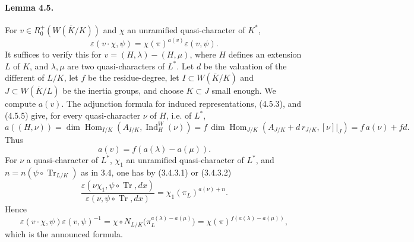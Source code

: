 \documentclass[10pt]{article}
\newcommand{\Hom}{\operatorname{Hom}}
\newcommand{\Ind}{\operatorname{Ind}}
\newcommand{\Tr}{\operatorname{Tr}}
\providecommand{\Hom}{\operatorname{Hom}}
\providecommand{\Hom}{\operatorname{Hom}}
\providecommand{\Tr}{\operatorname{Tr}}
\providecommand{\Hom}{\operatorname{Hom}}
\providecommand{\Tr}{\operatorname{Tr}}
\providecommand{\Tr}{\operatorname{Tr}}
\providecommand{\Ind}{\operatorname{Ind}}
\begin{document}
\paragraph{Lemma 4.5.} For \(v\in R^+_0(W(\overline K/K))\) and \(\chi\) an unramified quasi-character of \(K^*\),
\[
\varepsilon(v\cdot\chi,\psi)=\chi(\pi)^{a(v)}\varepsilon(v,\psi).
\]
It suffices to verify this for \(v=(H,\lambda)-(H,\mu)\), where \(H\) defines an extension \(L\) of \(K\), and \(\lambda,\mu\) are two quasi-characters of \(L^*\). Let \(d\) be the valuation of the different of \(L/K\), let \(f\) be the residue-degree, let \(I\subset W(\overline K/K)\) and \(J\subset W(\overline K/L)\) be the inertia groups, and choose \(K\subset J\) small enough. We compute \(a(v)\). The adjunction formula for induced representations, (4.5.3), and (4.5.5) give, for every quasi-character \(\nu\) of \(H\), i.e. of \(L^*\),
\[
\tag{4.5.1'}
a((H,\nu))
=\dim\Hom_{I/K}(A_{I/K},\Ind_H^W(\nu))
=f\,\dim\Hom_{J/K}(A_{J/K}+d\,r_{J/K},[\nu]|_J)
=f\,a(\nu)+fd.
\]
Thus
\[
a(v)=f(a(\lambda)-a(\mu)).
\]
For \(\nu\) a quasi-character of \(L^*\), \(\chi_1\) an unramified quasi-character of \(L^*\), and \(n=n(\psi\circ\Tr_{L/K})\) as in 3.4, one has by (3.4.3.1) or (3.4.3.2)
\[
\frac{\varepsilon(\nu\chi_1,\psi\circ\Tr,dx)}
     {\varepsilon(\nu,\psi\circ\Tr,dx)}
=
\chi_1(\pi_L)^{a(\nu)+n}.
\]
Hence
\[
\varepsilon(v\cdot\chi,\psi)\varepsilon(v,\psi)^{-1}
=
\chi\circ N_{L/K}\bigl(\pi_L^{a(\lambda)-a(\mu)}\bigr)
=
\chi(\pi)^{f(a(\lambda)-a(\mu))},
\]
which is the announced formula.


\newpage
\end{document}
